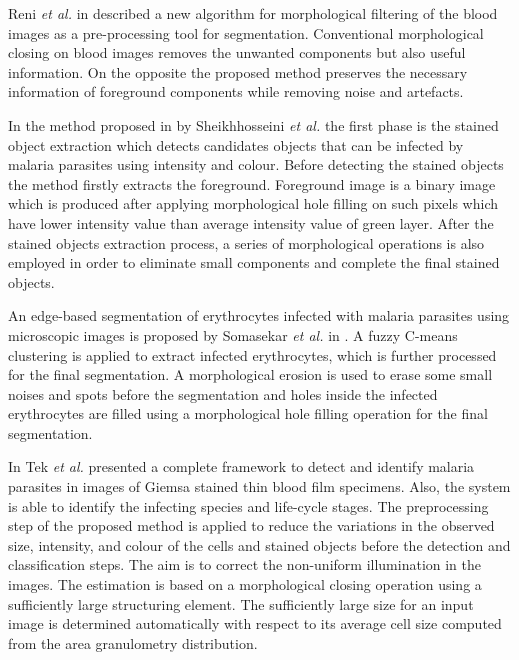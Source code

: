 \documentclass[sensors,review,submit,moreauthors,pdftex,10pt,a4paper]{mdpi}
\begin{document}
	Reni \emph{et al.} in \cite{Reni2015} described a new algorithm for morphological filtering of the blood images as a pre-processing tool for segmentation. Conventional morphological closing on blood images removes the unwanted components but also useful information. On the opposite the proposed method preserves the necessary information of foreground components while removing noise and artefacts.
	
	In the method proposed in \cite{Sheik2013} by Sheikhhosseini \emph{et al.} the first phase is the stained object extraction which detects candidates objects that can be infected by malaria parasites using intensity and colour. Before detecting the stained objects the method firstly extracts the foreground. Foreground image is a binary image which is produced after applying morphological hole filling on such pixels which have lower intensity value than average intensity value of green layer. After the stained objects extraction process, a series of morphological operations is also employed in order to eliminate small components and complete the final stained objects.
	
	An edge-based segmentation of erythrocytes infected with malaria parasites using microscopic images is proposed by Somasekar \emph{et al.} in \cite{Somasekar2015}.  A fuzzy C-means clustering is applied to extract infected erythrocytes, which is further processed for the final segmentation. A morphological erosion is used to erase some small noises and spots before the segmentation and holes inside the infected erythrocytes are filled using a morphological hole filling operation for the final segmentation.
	
	In \cite{Tek2010} Tek \emph{et al.} presented a complete framework to detect and identify malaria parasites in images of Giemsa stained thin blood film specimens. Also, the system is able to identify the infecting species and life-cycle stages.
	The preprocessing step of the proposed method is applied to reduce the variations in the observed size, intensity, and colour of the cells and stained objects before the detection and classification steps. The aim is to correct the non-uniform illumination in the images. The estimation is based on a morphological closing operation using a sufficiently large structuring element. The sufficiently large size for an input image is determined automatically with respect to its average cell size computed from the area granulometry distribution.
	
\end{document}
